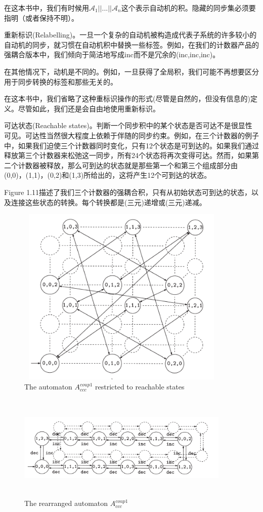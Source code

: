 \documentclass{book}
\begin{document}
    在这本书中，我们有时候用$\mathcal{A}_1||...||\mathcal{A}_n$这个表示自动机的积。隐藏的同步集必须要指明（或者保持不明）。

    重新标识(Relabelling)。一旦一个复杂的自动机被构造成代表子系统的许多较小的自动机的同步，就习惯在自动机积中替换一些标签。例如，在我们的计数器产品的强耦合版本中，我们倾向于简洁地写成inc而不是冗余的(inc,inc,inc)。

    在其他情况下，动机是不同的。例如，一旦获得了全局积，我们可能不再想要区分用于同步转换的标签和那些无关的。

    在这本书中，我们省略了这种重标识操作的形式(尽管是自然的，但没有信息的)定义。尽管如此，我们还是会自由地使用重新标识。

    可达状态(Reachable states)。判断一个同步积中的某个状态是否可达不是很显性可见。可达性当然很大程度上依赖于伴随的同步约束。例如，在三个计数器的例子中，如果我们迫使三个计数器同时变化，只有12个状态是可到达的。如果我们通过释放第三个计数器来松弛这一同步，所有24个状态将再次变得可达。然而，如果第二个计数器被释放，那么可到达的状态就是那些第一个和第三个组成部分由(0,0)，(1,1)，(0,2)和(1,3)所给出的，这将产生12个可到达的状态。

    Figure 1.11描述了我们三个计数器的强耦合积，只有从初始状态可到达的状态，以及连接这些状态的转换。每个转换都是(三元)递增或(三元)递减。
    \begin{figure}
    \centering
    \includegraphics[height=3.4in,width=4.0in]{1_11.png}
    \caption{The automaton $A_{ccc}^{coup1}$ restricted to reachable states}
    \end{figure}
    \begin{figure}
    \centering
    \includegraphics[height=2.0in,width=4.0in]{1_12.png}
    \caption{The rearranged automaton $A_{ccc}^{coup1}$}
    \end{figure}
\end{document}

